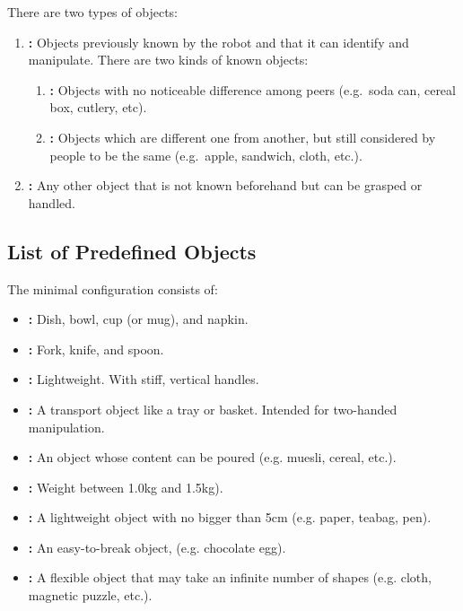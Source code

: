 There are two types of objects:

\begin{enumerate}
	\item \textbf{:} Objects previously known by the robot and that it can identify and manipulate.
	There are two kinds of known objects:
	\begin{enumerate}
		\item \textbf{:} Objects with no noticeable difference among peers (e.g.~soda can, cereal box, cutlery, etc).
		\item \textbf{:} Objects which are different one from another, but still considered by people to be the same (e.g.~apple, sandwich, cloth, etc.).
	\end{enumerate}

	\item \textbf{:} Any other object that is not known beforehand but can be grasped or handled.
\end{enumerate}

\subsection{List of Predefined Objects}
\label{rule:scenario_objects_list}
The minimal configuration consists of:
\begin{itemize}
	\item \textbf{:} Dish, bowl, cup (or mug), and napkin.
	\item \textbf{:} Fork, knife, and spoon.
	\item \textbf{:} Lightweight. With stiff, vertical handles.
	\item \textbf{:} A transport object like a tray or basket. Intended for two-handed manipulation.
	\item \textbf{:} An object whose content can be poured (e.g. muesli, cereal, etc.).
	\item \textbf{:} Weight between 1.0kg and 1.5kg).
	\item \textbf{:} A lightweight object with no bigger than 5cm (e.g. paper, teabag, pen).
	\item \textbf{:} An easy-to-break object, (e.g. chocolate egg).
	\item \textbf{:} A flexible object that may take an infinite number of shapes (e.g. cloth, magnetic puzzle, etc.).
\end{itemize}

